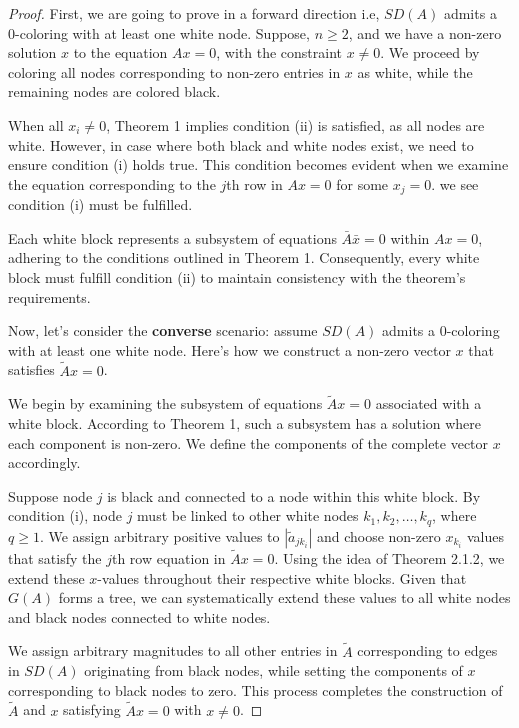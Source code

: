 \begin{proof}
	 First, we are going to prove in a forward direction i.e, $SD(A)$ admits a 0-coloring with at least one white node.
	 Suppose, $n \geq 2$, and we have a non-zero solution $x$ to the equation $Ax = 0$, with the constraint $x \neq 0$. We proceed by coloring all nodes corresponding to non-zero entries in $x$ as white, while the remaining nodes are colored black.
	
   	When all $x_i \neq 0$, Theorem 1 implies condition (ii) is satisfied, as all nodes are white. However, in case where both black and white nodes exist, we need to ensure condition (i) holds true. This condition becomes evident when we examine the equation corresponding to the $j$th row in $Ax = 0$ for some $x_j = 0$. we see condition (i) must be fulfilled.
	
	Each white block represents a subsystem of equations $\bar{A}\bar{x}=0$ within $Ax = 0$, adhering to the conditions outlined in Theorem 1. Consequently, every white block must fulfill condition (ii) to maintain consistency with the theorem's requirements.
	
	Now, let's consider the \textbf{converse} scenario: assume $SD(A)$ admits a 0-coloring with at least one white node. Here's how we construct a non-zero vector $x$ that satisfies $\tilde{A}x = 0$.
	
	We begin by examining the subsystem of equations $\tilde{A}x = 0$ associated with a white block. According to Theorem 1, such a subsystem has a solution where each component is non-zero. We define the components of the complete vector $x$ accordingly.
	
	Suppose node $j$ is black and connected to a node within this white block. By condition (i), node $j$ must be linked to other white nodes $k_1, k_2, \ldots, k_q$, where $q \geq 1$. We assign arbitrary positive values to $|\tilde{a}_{jk_{i}}|$ and choose non-zero ${x_{k_i}}$ values that satisfy the $j$th row equation in $\tilde{A}x = 0$. Using the idea of Theorem 2.1.2, we extend these $x$-values throughout their respective white blocks. Given that $G(A)$ forms a tree, we can systematically extend these values to all white nodes and black nodes connected to white nodes.
	
	We assign arbitrary magnitudes to all other entries in $\tilde{A}$ corresponding to edges in $SD(A)$ originating from black nodes, while setting the components of $x$ corresponding to black nodes to zero. This process completes the construction of $\tilde{A}$ and $x$ satisfying $\tilde{A}x = 0$ with $x \neq 0$.

\end{proof}
